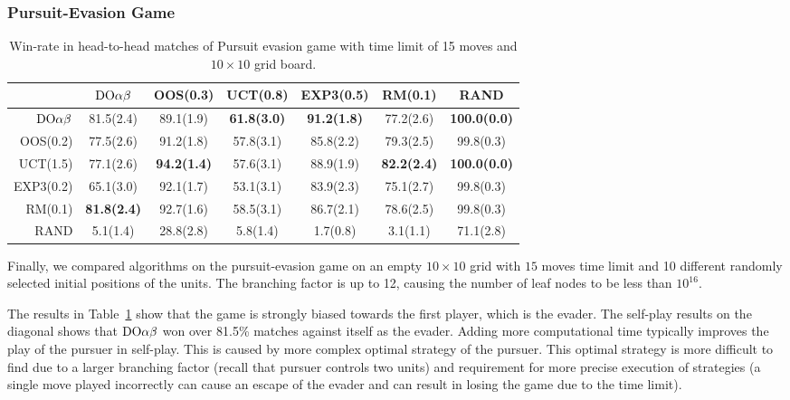 \subsubsection{Pursuit-Evasion Game}

\begin{table}
\centering
\begin{scriptsize}

\begin{tabular}{|r|cccccc|}\hline
&$\textrm{DO}\alpha\beta$&OOS(0.3)&UCT(0.8)&EXP3(0.5)&RM(0.1)&RAND\\\hline
$\textrm{DO}\alpha\beta$&81.5(2.4)&89.1(1.9)&\textbf{61.8(3.0)}&\textbf{91.2(1.8)}&77.2(2.6)&\textbf{100.0(0.0)}\\
OOS(0.2)&77.5(2.6)&91.2(1.8)&57.8(3.1)&85.8(2.2)&79.3(2.5)&99.8(0.3)\\
UCT(1.5)&77.1(2.6)&\textbf{94.2(1.4)}&57.6(3.1)&88.9(1.9)&\textbf{82.2(2.4)}&\textbf{100.0(0.0)}\\
EXP3(0.2)&65.1(3.0)&92.1(1.7)&53.1(3.1)&83.9(2.3)&75.1(2.7)&99.8(0.3)\\
RM(0.1)&\textbf{81.8(2.4)}&92.7(1.6)&58.5(3.1)&86.7(2.1)&78.6(2.5)&99.8(0.3)\\
RAND&5.1(1.4)&28.8(2.8)&5.8(1.4)&1.7(0.8)&3.1(1.1)&71.1(2.8)\\
\hline
\end{tabular}

\end{scriptsize}
\caption{Win-rate in head-to-head matches of Pursuit evasion game with time limit of 15 moves and $10\times 10$ grid board.}\label{fig:matches:peg}
\end{table}


Finally, we compared algorithms on the pursuit-evasion game on an empty $10\times 10$ grid with $15$ moves time limit and 10 different randomly selected initial positions of the units. The branching factor is up to 12, causing the number of leaf nodes to be less than $10^{16}$.

The results in Table~\ref{fig:matches:peg} show that the game is strongly biased towards the first player, which is the evader. The self-play results on the diagonal shows that $\textrm{DO}\alpha\beta$ won over 81.5\% matches against itself as the evader. Adding more computational time typically improves the play of the pursuer in self-play. This is caused by more complex optimal strategy of the pursuer. This optimal strategy is more difficult to find due to a larger branching factor (recall that pursuer controls two units) and requirement for more precise execution of strategies (a single move played incorrectly can cause an escape of the evader and can result in losing the game due to the time limit).

